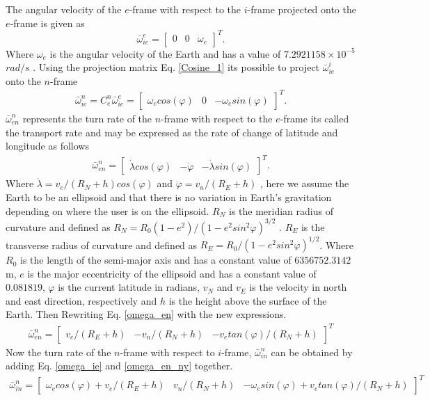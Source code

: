 The angular velocity of the $e$-frame with respect to the $i$-frame projected onto the $e$-frame is given as \cite{nonlinear}
\begin{equation}
\bar{\omega}_{ie}^e = 
\begin{bmatrix}
0 & 0 & \omega_e
\end{bmatrix}^T.
\end{equation}
Where $\omega_e$ is the angular velocity of the Earth and has a value of
$7.2921158 \times 10^{-5}$ $rad/s$ \cite{nonlinear}. Using the projection matrix Eq. \eqref{Cosine_1} its possible to project $\bar{\omega}_ {ie}^i$ onto the $n$-frame
\begin{align}
\bar{\omega}_{ie}^n=C_e^n\bar{\omega}_{ie}^e=
\begin{bmatrix}
\omega_e cos(\varphi) & 0 & -\omega_e sin(\varphi)
\end{bmatrix}^T.
\label{omega_ie}
\end{align}
$\bar{\omega}_{en}^n$ represents the turn rate of the $n$-frame with respect to the $e$-frame its called the transport rate and may be expressed as the rate of change of latitude and longitude as follows
\begin{align}
\bar{\omega}_{en}^n=
\begin{bmatrix}
\dot{\lambda}cos(\varphi) & -\dot{\varphi} & -\dot{\lambda}sin(\varphi)
\end{bmatrix}^T.
\label{omega_en}
\end{align}
Where $\dot{\lambda}=v_e/(R_N+h)cos(\varphi)$ and $\dot{\varphi}=v_n/(R_E+h)$ \cite{nonlinear}, here we assume the Earth to be an ellipsoid and that there is no variation in Earth's gravitation depending on where the user is on the ellipsoid. $R_N$ is the meridian radius of curvature and defined as $R_N=R_0(1-e^2)/(1-e^2sin^2\varphi)^{3/2}$ \cite{nonlinear}. $R_E$ is the transverse radius of curvature and defined as $R_E=R_0/(1-e^2sin^2\varphi)^{1/2}$. Where $R_0$ is the length of the semi-major axis and has a constant value of $6356752.3142$ m, $e$ is the major eccentricity of the ellipsoid and has a constant value of $0.081819$, $\varphi$ is the current latitude in radians, $v_N$ and $v_E$ is the velocity in north and east direction, respectively and $h$ is the height above the surface of the Earth. Then Rewriting Eq. \eqref{omega_en} with the new expressions.
\begin{align}
\bar{\omega}_{en}^n=
\begin{bmatrix}
v_e/(R_E+h) & -v_n/(R_N+h) & -v_e tan(\varphi)/(R_N+h)
\end{bmatrix}^T \label{omega_en_ny}
\end{align}
Now the turn rate of the $n$-frame with respect to $i$-frame, $\bar{\omega}_{in}^n$ can be obtained by adding Eq. \eqref{omega_ie} and \eqref{omega_en_ny} together.
\begin{align}
\bar{\omega}_{in}^n=
\begin{bmatrix}
\omega_e cos(\varphi) + v_e/(R_E+h) & v_n/(R_N+h) & -\omega_e sin(\varphi) + v_e tan(\varphi)/(R_N+h)
\end{bmatrix}^T
\label{Eq.omega_in}
\end{align}

